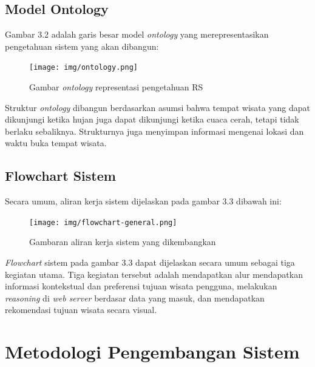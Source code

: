 \subsection{Model Ontology}

Gambar 3.2 adalah garis besar model \textit{ontology} yang merepresentasikan pengetahuan sistem yang akan dibangun:
\begin{figure}[h!]
    \centering
    \texttt{[image: img/ontology.png]}
    \caption{Gambar \textit{ontology} representasi pengetahuan RS}
    \label{fig:Gambar}
\end{figure}
\newline
Struktur \textit{ontology} dibangun berdasarkan asumsi bahwa tempat wisata yang dapat dikunjungi ketika hujan juga dapat dikunjungi ketika cuaca cerah, tetapi tidak berlaku sebaliknya. Strukturnya juga menyimpan informasi mengenai lokasi dan waktu buka tempat wisata.
 
\subsection{Flowchart Sistem}
Secara umum, aliran kerja sistem dijelaskan pada gambar 3.3 dibawah ini:
\begin{figure}[h!]
    \centering
    \texttt{[image: img/flowchart-general.png]}
    \caption{Gambaran aliran kerja sistem yang dikembangkan}
    \label{fig:Gambar}
\end{figure}
\textit{Flowchart} sistem pada gambar 3.3 dapat dijelaskan secara umum sebagai tiga kegiatan utama. Tiga kegiatan tersebut adalah mendapatkan alur mendapatkan informasi kontekstual dan preferensi tujuan wisata pengguna, melakukan \textit{reasoning} di \textit{web server} berdasar data yang masuk, dan mendapatkan rekomendasi tujuan wisata secara visual.
\section{Metodologi Pengembangan Sistem}

